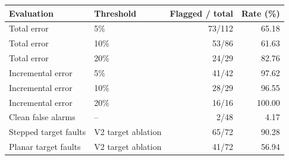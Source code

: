 \begin{tabularx}{\linewidth}{>{\raggedright\arraybackslash}X l r r}
\toprule
Evaluation & Threshold & Flagged / total & Rate (\%) \\
\midrule
Total error & 5\% & 73/112 & 65.18 \\
Total error & 10\% & 53/86 & 61.63 \\
Total error & 20\% & 24/29 & 82.76 \\
Incremental error & 5\% & 41/42 & 97.62 \\
Incremental error & 10\% & 28/29 & 96.55 \\
Incremental error & 20\% & 16/16 & 100.00 \\
Clean false alarms & -- & 2/48 & 4.17 \\
Stepped target faults & V2 target ablation & 65/72 & 90.28 \\
Planar target faults & V2 target ablation & 41/72 & 56.94 \\
\bottomrule
\end{tabularx}
